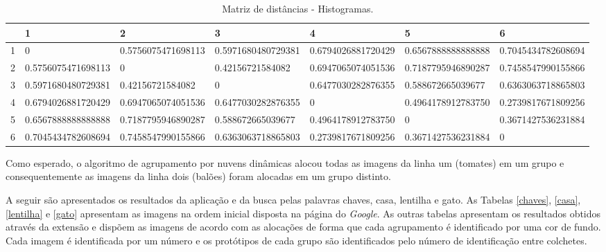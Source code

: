 \begin{table}
\centering
    \caption{Matriz de distâncias - Histogramas.}
\begin{tabular}{|l|l|l|l|l|l|l|}
        \hline
         & 1 & 2  & 3 & 4 & 5 & 6   \\ \hline
        1   &  0 & \cellcolor{blue!25}0.5756075471698113 & \cellcolor{blue!25}0.5971680480729381 & 0.6794026881720429 &  0.6567888888888888 & 0.7045434782608694\\ 
        \hline
        2   &  \cellcolor{blue!25}0.5756075471698113 & 0& \cellcolor{blue!25}0.42156721584082& 0.6947065074051536 &  0.7187795946890287 & 0.7458547990155866\\ 
        \hline
        3   &  \cellcolor{blue!25}0.5971680480729381 & \cellcolor{blue!25}0.42156721584082 & 0 & 0.6477030282876355 &  0.588672665039677 & 0.6363063718865803\\ 
        \hline
        4   &  0.6794026881720429 & 0.6947065074051536 & 0.6477030282876355 & 0 &  \cellcolor{blue!25}0.4964178912783750 & \cellcolor{blue!25}0.2739817671809256\\
        \hline 
        5   &  0.6567888888888888 & 0.7187795946890287 & 0.588672665039677 & \cellcolor{blue!25}0.4964178912783750 &  0 & \cellcolor{blue!25}0.3671427536231884\\ 
        \hline
        6   &  0.7045434782608694 & 0.7458547990155866 & 0.6363063718865803 & \cellcolor{blue!25}0.2739817671809256 &  \cellcolor{blue!25}0.3671427536231884 & 0\\ 
        \hline
    \end{tabular}
\label{matrizDistanciaHistogramas}

\end{table}

\pagebreak

Como esperado, o algoritmo de agrupamento por nuvens dinâmicas alocou todas as imagens da linha um (tomates) em um grupo e consequentemente as imagens da linha dois (balões) foram alocadas em um grupo distinto.

A seguir são apresentados os resultados da aplicação e da busca pelas palavras chaves, casa, lentilha e gato. As Tabelas \ref{chaves}, \ref{casa}, \ref{lentilha} e \ref{gato} apresentam as imagens na ordem inicial disposta na página do \emph{Google}. As outras tabelas apresentam os resultados obtidos através da extensão e dispõem as imagens de acordo com as alocações de forma que cada agrupamento é identificado por uma cor de fundo. Cada imagem é identificada por um número e os protótipos de cada grupo são identificados pelo número de identificação entre colchetes.

